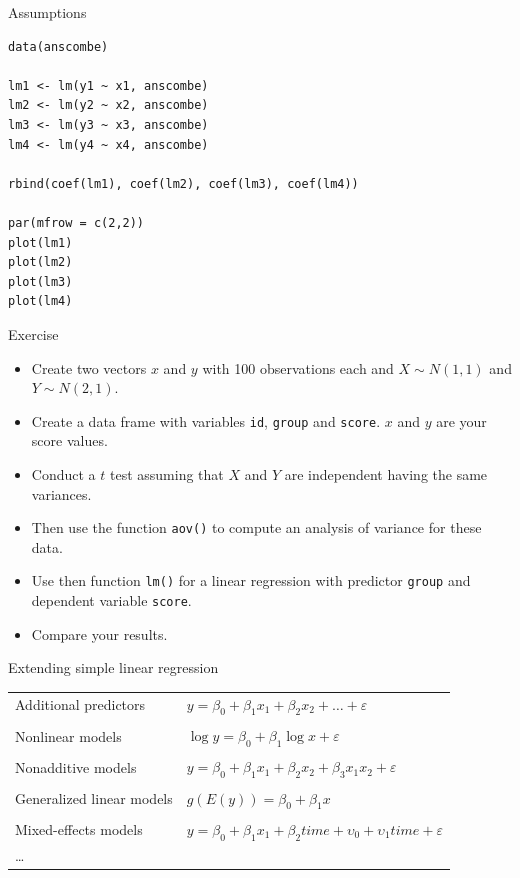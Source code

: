 \documentclass[aspectratio=169]{beamer}
\begin{document}
\begin{frame}[fragile]{Assumptions}
\begin{lstlisting}
data(anscombe)

lm1 <- lm(y1 ~ x1, anscombe)
lm2 <- lm(y2 ~ x2, anscombe)
lm3 <- lm(y3 ~ x3, anscombe)
lm4 <- lm(y4 ~ x4, anscombe)

rbind(coef(lm1), coef(lm2), coef(lm3), coef(lm4))

par(mfrow = c(2,2))
plot(lm1)
plot(lm2)
plot(lm3)
plot(lm4)
\end{lstlisting}
\end{frame}

\begin{frame}{}
  \begin{block}{Exercise}
    \begin{itemize}
      \item Create two vectors $x$ and $y$ with 100 observations each and
        $X \sim N(1,1)$ and $Y \sim N(2,1)$.
      \item Create a data frame with variables \texttt{id}, \texttt{group}
        and \texttt{score}. $x$ and $y$ are your score values.
      \item Conduct a $t$ test assuming that $X$ and $Y$ are independent
        having the same variances.
      \item Then use the function \texttt{aov()} to compute an analysis of
        variance for these data.
      \item Use then function \texttt{lm()} for a linear regression with
        predictor \texttt{group} and dependent variable \texttt{score}.
      \item Compare your results.
    \end{itemize}
  \end{block}
\end{frame}

\begin{frame}{Extending simple linear regression}
  \begin{tabular}{ll}
    Additional predictors &
      $y = \beta_0 + \beta_1 x_1 + \beta_2 x_2 + \dots +
      \varepsilon$\\
      & \\
    Nonlinear models &
      $\log y = \beta_0 + \beta_1 \log x + \varepsilon$\\
      & \\
    Nonadditive models &
      $y = \beta_0 + \beta_1 x_1 + \beta_2 x_2 + \beta_3
      x_1 x_2 + \varepsilon$\\
      & \\
    Generalized linear models &
      $g(E(y)) = \beta_0 + \beta_1 x$\\
      & \\
    Mixed-effects models &
      $y = \beta_0 + \beta_1 x_1 + \beta_2 time + 
      \upsilon_0 + \upsilon_1 time + \varepsilon$\\
      \dots & \\
  \end{tabular}
\end{frame}
\end{document}
